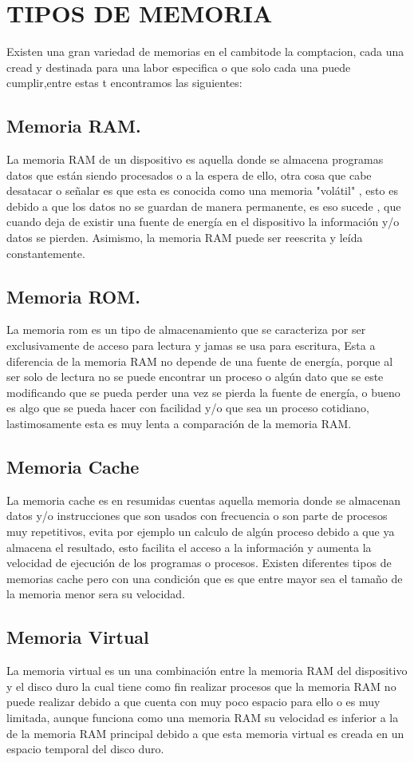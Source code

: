 \documentclass{article}
\begin{document}
\section{TIPOS DE MEMORIA} \label{contenido}
Existen una gran variedad de memorias  en el cambitode la comptacion, cada una cread y destinada para una labor especifica o que solo cada una puede cumplir,entre estas t encontramos las siguientes:
\subsection{Memoria RAM.}
La memoria RAM  de un dispositivo  es aquella donde se almacena programas datos que están siendo procesados o a la espera de ello, otra cosa que cabe desatacar o señalar es que  esta es conocida como una  memoria "volátil" , esto es debido a que los datos no se guardan de manera permanente, es eso sucede , que cuando deja de existir una fuente de energía en el dispositivo la información y/o datos se pierden. Asimismo, la memoria RAM puede ser reescrita y leída constantemente.

\subsection{Memoria ROM.}
La memoria rom es un tipo de almacenamiento que se caracteriza por ser exclusivamente de acceso para lectura y jamas se usa para escritura, Esta a diferencia de la memoria RAM no depende de una fuente de energía, porque al ser solo de lectura no se puede encontrar un proceso o algún dato que se este modificando que se pueda perder una vez se pierda la fuente de energía, o bueno es algo que se pueda hacer con facilidad y/o que sea un proceso cotidiano, lastimosamente esta es muy lenta a comparación de la memoria RAM.

\subsection {Memoria Cache}
La memoria cache es en resumidas cuentas aquella memoria donde se almacenan datos y/o instrucciones que son usados con frecuencia o son parte de procesos muy repetitivos, evita por ejemplo un calculo de algún proceso debido a que ya almacena el resultado, esto facilita el acceso a la información y aumenta la velocidad de ejecución de los programas o procesos.
Existen diferentes tipos de memorias cache pero con una condición que es que entre mayor sea el tamaño de la memoria menor sera su velocidad.

\subsection{Memoria Virtual}
La memoria virtual es un una combinación entre la memoria RAM del dispositivo y el disco duro la cual tiene como fin realizar procesos que la memoria RAM no puede realizar debido a que cuenta con muy poco espacio para ello o es muy limitada, aunque funciona como una memoria RAM su velocidad es inferior a la de la memoria RAM principal debido a que esta memoria virtual es creada en un espacio temporal del disco duro.
\end{document}
